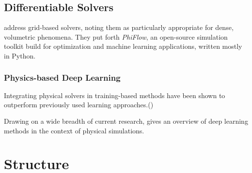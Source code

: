 
\subsection{Differentiable Solvers}
\cite{control-pde} address grid-based solvers, noting them as
particularly appropriate for dense, volumetric phenomena. They put forth
\textit{PhiFlow}, an open-source simulation toolkit build for optimization and
machine learning applications, written mostly in Python.


\subsubsection*{Physics-based Deep Learning}
Integrating physical solvers in training-based methods have been shown to
outperform previously used learning approaches.(\cite{solver-in-the-loop})

Drawing on a wide breadth of current research, \cite{pbdl} gives an overview of
deep learning methods in the context of physical simulations. 



\section{Structure}
